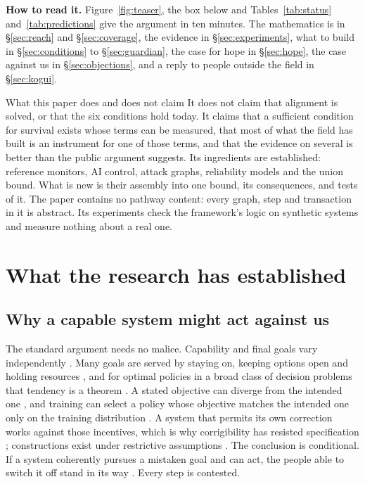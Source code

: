 \documentclass[10pt,twocolumn,letterpaper]{article}
\theoremstyle{definition}
\newcommand{\para}[1]{\smallskip\noindent\textbf{#1}\enspace}
\begin{document}
\para{How to read it.} Figure~\ref{fig:teaser}, the box below and Tables~\ref{tab:status} and~\ref{tab:predictions} give the argument in ten minutes. The mathematics is in \S\ref{sec:reach} and \S\ref{sec:coverage}, the evidence in \S\ref{sec:experiments}, what to build in \S\ref{sec:conditions} to \S\ref{sec:guardian}, the case for hope in \S\ref{sec:hope}, the case against us in \S\ref{sec:objections}, and a reply to people outside the field in \S\ref{sec:kogui}.

\begin{claimbox}{What this paper does and does not claim}
\small
It does not claim that alignment is solved, or that the six conditions hold today. It claims that a sufficient condition for survival exists whose terms can be measured, that most of what the field has built is an instrument for one of those terms, and that the evidence on several is better than the public argument suggests. Its ingredients are established: reference monitors, AI control, attack graphs, reliability models and the union bound. What is new is their assembly into one bound, its consequences, and tests of it. The paper contains no pathway content: every graph, step and transaction in it is abstract. Its experiments check the framework's logic on synthetic systems and measure nothing about a real one.
\end{claimbox}

\section{What the research has established}
\label{sec:field}

\subsection{Why a capable system might act against us}

The standard argument needs no malice. Capability and final goals vary independently \cite{bostrom2012}. Many goals are served by staying on, keeping options open and holding resources \cite{omohundro}, and for optimal policies in a broad class of decision problems that tendency is a theorem \cite{turner}. A stated objective can diverge from the intended one \cite{amodei}, and training can select a policy whose objective matches the intended one only on the training distribution \cite{hubinger2019,langosco}. A system that permits its own correction works against those incentives, which is why corrigibility has resisted specification \cite{soares}; constructions exist under restrictive assumptions \cite{hadfield2017,hudson}. The conclusion is conditional. If a system coherently pursues a mistaken goal and can act, the people able to switch it off stand in its way \cite{carlsmith}. Every step is contested.
\end{document}
